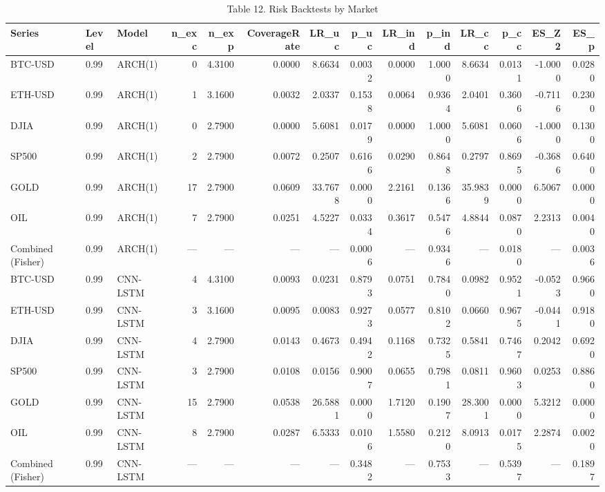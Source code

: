 \begin{table}[ht]
\centering
\caption{Table 12. Risk Backtests by Market}
\label{tab:risk_by_market}
\begin{tabular}{lllrrrrrrrrrrr}
\toprule
Series & Level & Model & n_exc & n_exp & CoverageRate & LR_uc & p_uc & LR_ind & p_ind & LR_cc & p_cc & ES_Z2 & ES_p \\
\midrule
BTC-USD & 0.99 & ARCH(1) & 0 & 4.3100 & 0.0000 & 8.6634 & 0.0032 & 0.0000 & 1.0000 & 8.6634 & 0.0131 & -1.0000 & 0.0280 \\
ETH-USD & 0.99 & ARCH(1) & 1 & 3.1600 & 0.0032 & 2.0337 & 0.1538 & 0.0064 & 0.9364 & 2.0401 & 0.3606 & -0.7116 & 0.2300 \\
DJIA & 0.99 & ARCH(1) & 0 & 2.7900 & 0.0000 & 5.6081 & 0.0179 & 0.0000 & 1.0000 & 5.6081 & 0.0606 & -1.0000 & 0.1300 \\
SP500 & 0.99 & ARCH(1) & 2 & 2.7900 & 0.0072 & 0.2507 & 0.6166 & 0.0290 & 0.8648 & 0.2797 & 0.8695 & -0.3686 & 0.6400 \\
GOLD & 0.99 & ARCH(1) & 17 & 2.7900 & 0.0609 & 33.7678 & 0.0000 & 2.2161 & 0.1366 & 35.9839 & 0.0000 & 6.5067 & 0.0000 \\
OIL & 0.99 & ARCH(1) & 7 & 2.7900 & 0.0251 & 4.5227 & 0.0334 & 0.3617 & 0.5476 & 4.8844 & 0.0870 & 2.2313 & 0.0040 \\
Combined (Fisher) & 0.99 & ARCH(1) & — & — & — & — & 0.0006 & — & 0.9346 & — & 0.0180 & — & 0.0036 \\
BTC-USD & 0.99 & CNN-LSTM & 4 & 4.3100 & 0.0093 & 0.0231 & 0.8793 & 0.0751 & 0.7840 & 0.0982 & 0.9521 & -0.0523 & 0.9660 \\
ETH-USD & 0.99 & CNN-LSTM & 3 & 3.1600 & 0.0095 & 0.0083 & 0.9273 & 0.0577 & 0.8102 & 0.0660 & 0.9675 & -0.0441 & 0.9180 \\
DJIA & 0.99 & CNN-LSTM & 4 & 2.7900 & 0.0143 & 0.4673 & 0.4942 & 0.1168 & 0.7325 & 0.5841 & 0.7467 & 0.2042 & 0.6920 \\
SP500 & 0.99 & CNN-LSTM & 3 & 2.7900 & 0.0108 & 0.0156 & 0.9007 & 0.0655 & 0.7981 & 0.0811 & 0.9603 & 0.0253 & 0.8860 \\
GOLD & 0.99 & CNN-LSTM & 15 & 2.7900 & 0.0538 & 26.5881 & 0.0000 & 1.7120 & 0.1907 & 28.3001 & 0.0000 & 5.3212 & 0.0000 \\
OIL & 0.99 & CNN-LSTM & 8 & 2.7900 & 0.0287 & 6.5333 & 0.0106 & 1.5580 & 0.2120 & 8.0913 & 0.0175 & 2.2874 & 0.0020 \\
Combined (Fisher) & 0.99 & CNN-LSTM & — & — & — & — & 0.3482 & — & 0.7533 & — & 0.5397 & — & 0.1897 \\

\end{tabular}
\end{table}
